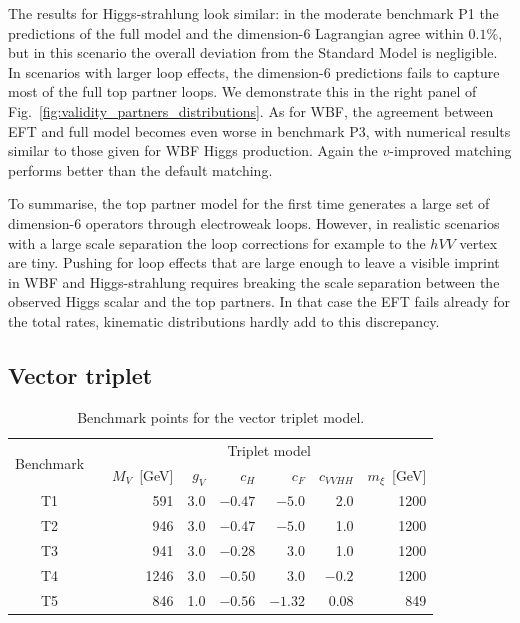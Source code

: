 The results for Higgs-strahlung look similar: in the moderate
benchmark P1 the predictions of the full model and the dimension-6
Lagrangian agree within $0.1 \%$, but in this scenario the overall
deviation from the Standard Model is negligible. In scenarios with
larger loop effects, the dimension-6 predictions fails to capture most
of the full top partner loops.  We demonstrate this in the right panel
of Fig.~\ref{fig:validity_partners_distributions}.  As for WBF, the agreement
between EFT and full model becomes even worse in benchmark P3, with
numerical results similar to those given for WBF Higgs
production. Again the $v$-improved matching performs better than the
default matching.

To summarise, the top partner model for the first time generates a
large set of dimension-6 operators through electroweak loops. However,
in realistic scenarios with a large scale separation the loop
corrections for example to the $hVV$ vertex are tiny.  Pushing for
loop effects that are large enough to leave a visible imprint in WBF
and Higgs-strahlung requires breaking the scale separation between the
observed Higgs scalar and the top partners. In that case the EFT fails
already for the total rates, kinematic distributions hardly add to
this discrepancy.



\subsection{Vector triplet}
\label{sec:validity_triplet}

\begin{table}[t] \renewcommand{\arraystretch}{1.2}
\setlength{\tabcolsep}{0.3em} \centering
    \begin{tabular}{c c rrrrrr} \toprule \multirow{2}{*}{Benchmark}
&\hspace*{1em}& \multicolumn{6}{c}{Triplet model} \\ \cmidrule{3-8} &&
$M_V$~[GeV] & $g_V$ & $c_H$ & ${c}_{F}$ & ${c}_{VVHH}$ & $m_\xi$~[GeV]
\\ \midrule T1 && 591 & 3.0 & $-0.47$ & $-5.0$ & 2.0 & 1200 \\ T2 &&
946 & 3.0 & $-0.47$ & $-5.0$ & 1.0 & 1200 \\ T3 && 941 & 3.0 & $-0.28$
& $3.0$ & 1.0 & 1200 \\ T4 && 1246 & 3.0 & $-0.50$ & $3.0$ & $-0.2$ &
1200 \\ T5 && 846 & 1.0 & $-0.56$ & $-1.32$ & $0.08$ & 849 \\
\bottomrule
    \end{tabular}
  \caption{Benchmark points for the vector triplet model.}
  \label{tab:triplet_benchmarks} \setlength{\tabcolsep}{0.5em}
\end{table}

